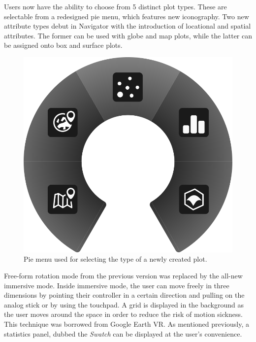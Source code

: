 \documentclass[thesis=M,english,hidelinks]{FITthesisXE}[2012/06/26]
\begin{document}
Users now have the ability to choose from 5 distinct plot types. These are selectable from a redesigned pie menu, which features new iconography. Two new attribute types debut in Navigator with the introduction of locational and spatial attributes. The former can be used with globe and map plots, while the latter can be assigned onto box and surface plots.

\begin{figure}[ht]
\centering
\includegraphics[scale=0.4]{navigator_plotselector}
\caption{Pie menu used for selecting the type of a newly created plot.}
\label{fig:navigator_plotselector}
\end{figure}

Free-form rotation mode from the previous version was replaced by the all-new immersive mode. Inside immersive mode, the user can move freely in three dimensions by pointing their controller in a certain direction and pulling on the analog stick or by using the touchpad. A grid is displayed in the background as the user moves around the space in order to reduce the risk of motion sickness. This technique was borrowed from Google Earth VR.\autocite{earthux} As mentioned previously, a statistics panel, dubbed the \emph{Swatch} can be displayed at the user's convenience.
\end{document}

